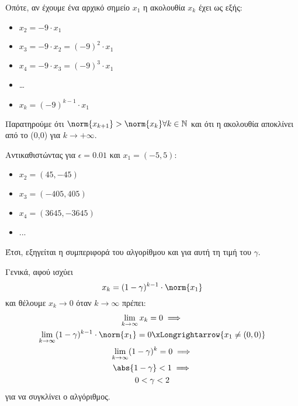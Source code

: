 \begin{enumerate}[i)]
	Οπότε, αν έχουμε ένα αρχικό σημείο $x_1$ η ακολουθία $x_k$ έχει ως εξής:
	\begin{itemize}
		\item $x_2 = -9 \cdot x_1$
		\item $x_3 = -9 \cdot x_2 = (-9)^2 \cdot x_1$
		\item $x_4 = -9 \cdot x_3 = (-9)^3 \cdot x_1$
		\item \ldots
		\item $x_k = (-9)^{k-1} \cdot x_1$
	\end{itemize}
	Παρατηρούμε ότι $\norm{x_{k+1}} > \norm{x_{k}} \forall k \in \mathbb{N}$ και ότι η ακολουθία αποκλίνει από το (0,0) για $k \to +\infty$.
	
	Αντικαθιστώντας για $\epsilon = 0.01$ και $x_1 = (-5, 5)$:
	\begin{itemize}
		\item $x_2 = (45, -45)$
		\item $x_3 = (-405, 405)$
		\item $x_4 = (3645, -3645)$
		\item ...
	\end{itemize}
	Έτσι, εξηγείται η συμπεριφορά του αλγορίθμου και για αυτή τη τιμή του $\gamma$.
\end{enumerate}

\hfill \break
\hfill \break
Γενικά, αφού ισχύει 
\begin{equation*}
	x_k = (1 - \gamma)^{k - 1} \cdot \norm{x_1}
\end{equation*}
και θέλουμε $x_k \to 0$ όταν $k \to \infty$ πρέπει:
\begin{gather*}
	\lim_{k \to \infty} x_k = 0 \implies\\
	\lim_{k \to \infty} (1 - \gamma)^{k - 1} \cdot \norm{x_1} = 0 \xLongrightarrow{x_1 \neq (0,0)}\\
	\lim_{k \to \infty} (1 - \gamma)^k = 0 \implies\\
	\abs{1-\gamma} < 1 \implies\\
	0 < \gamma < 2
\end{gather*}
για να συγκλίνει ο αλγόριθμος.
